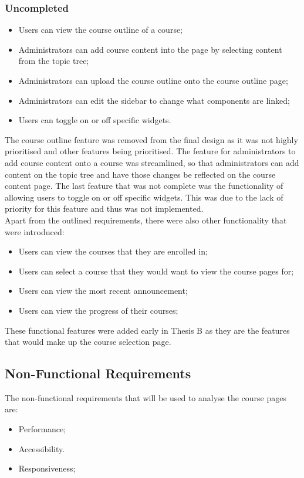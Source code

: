 \subsubsection{Uncompleted}
\begin{itemize}
    \item Users can view the course outline of a course;
    \item Administrators can add course content into the page by selecting content from the topic tree;
    \item Administrators can upload the course outline onto the course outline page;
    \item Administrators can edit the sidebar to change what components are linked;
    \item Users can toggle on or off specific widgets.
\end{itemize}

The course outline feature was removed from the final design as it was not highly prioritised and other features being prioritised. 
The feature for administrators to add course content onto a course was streamlined, so that administrators can add content on the topic tree and have those changes be reflected on the course content page.
The last feature that was not complete was the functionality of allowing users to toggle on or off specific widgets. This was due to the lack of priority for this feature and thus was not implemented.\\

Apart from the outlined requirements, there were also other functionality that were introduced:
\begin{itemize}
    \item Users can view the courses that they are enrolled in;
    \item Users can select a course that they would want to view the course pages for;
    \item Users can view the most recent announcement;
    \item Users can view the progress of their courses;
\end{itemize}

These functional features were added early in Thesis B as they are the features that would make up the course selection page.

\subsection{Non-Functional Requirements}
The non-functional requirements that will be used to analyse the course pages are:
\begin{itemize}
    \item Performance;
    \item Accessibility.
    \item Responsiveness;
\end{itemize}

